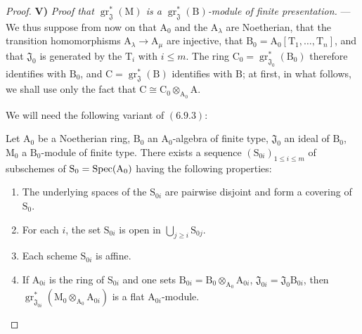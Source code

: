 \begin{proof}
\medskip
\noindent\textbf{V)} \emph{Proof that $\operatorname{gr}^*_\mathfrak{J}(\mathrm{M})$ is a $\operatorname{gr}^*_\mathfrak{J}(\mathrm{B})$-module of finite presentation.} --- We thus suppose from now on that $\mathrm{A}_0$ and the $\mathrm{A}_\lambda$ are Noetherian, that the transition homomorphisms $\mathrm{A}_\lambda\to\mathrm{A}_\mu$ are injective, that $\mathrm{B}_0=\mathrm{A}_0[\mathrm{T}_1,\ldots,\mathrm{T}_n]$, and that $\mathfrak{J}_0$ is generated by the $\mathrm{T}_i$ with $i\leqslant m$. The ring $\mathrm{C}_0=\operatorname{gr}^*_{\mathfrak{J}_0}(\mathrm{B}_0)$ therefore identifies with $\mathrm{B}_0$, and $\mathrm{C}=\operatorname{gr}^*_\mathfrak{J}(\mathrm{B})$ identifies with $\mathrm{B}$; at first, in what follows, we shall use only the fact that $\mathrm{C}\cong\mathrm{C}_0\otimes_{\mathrm{A}_0}\mathrm{A}$.

We will need the following variant of $(6.9.3)$:

\begin{lemma}[11.2.9.5]
\label{IV.11.2.9.5}
Let $\mathrm{A}_0$ be a Noetherian ring, $\mathrm{B}_0$ an
$\mathrm{A}_0$-algebra of finite type, $\mathfrak{J}_0$ an ideal of
$\mathrm{B}_0$, $\mathrm{M}_0$ a $\mathrm{B}_0$-module of finite type. There
exists a sequence $(\mathrm{S}_{0i})_{1\leqslant i\leqslant m}$ of
subschemes of $\mathrm{S}_0=\operatorname{Spec}(\mathrm{A}_0)$ having the following
properties:
\begin{enumerate}[label=\arabic{enumi}\textsuperscript{o}]
  \item The underlying spaces of the $\mathrm{S}_{0i}$ are pairwise disjoint and form a covering of $\mathrm{S}_0$.
  \item For each $i$, the set $\mathrm{S}_{0i}$ is open in $\bigcup_{j\geqslant i}\mathrm{S}_{0j}$.
  \item Each scheme $\mathrm{S}_{0i}$ is affine.
  \item If $\mathrm{A}_{0i}$ is the ring of $\mathrm{S}_{0i}$ and one sets $\mathrm{B}_{0i}=\mathrm{B}_0\otimes_{\mathrm{A}_0}\mathrm{A}_{0i}$, $\mathfrak{J}_{0i}=\mathfrak{J}_0\mathrm{B}_{0i}$, then $\operatorname{gr}^*_{\mathfrak{J}_{0i}}(\mathrm{M}_0\otimes_{\mathrm{A}_0}\mathrm{A}_{0i})$ is a flat $\mathrm{A}_{0i}$-module.
\end{enumerate}
\end{lemma}


\end{proof}

